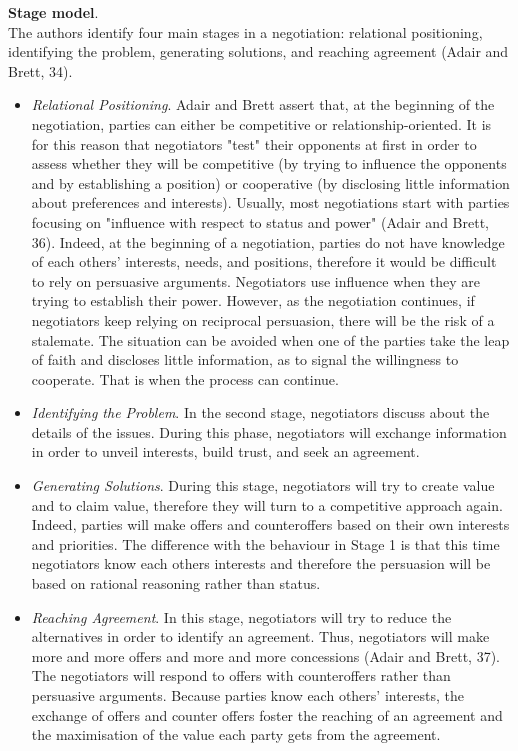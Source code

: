 \documentclass[../main.tex]{subfiles}
\begin{document}
\textbf{Stage model}.\\
The authors identify four main stages in a negotiation: relational positioning, identifying the problem, generating solutions, and reaching agreement (Adair and Brett, 34). 
\begin{itemize}
    \item \textit{Relational Positioning}. Adair and Brett assert that, at the beginning of the negotiation, parties can either be competitive or relationship-oriented. It is for this reason that negotiators "test" their opponents at first in order to assess whether they will be competitive (by trying to influence the opponents and by establishing a position) or cooperative (by disclosing little information about preferences and interests). Usually, most negotiations start with parties focusing on "influence with respect to status and power" (Adair and Brett, 36). Indeed, at the beginning of a negotiation, parties do not have knowledge of each others' interests, needs, and positions, therefore it would be difficult to rely on persuasive arguments. Negotiators use influence when they are trying to establish their power. However, as the negotiation continues, if negotiators keep relying on reciprocal persuasion, there will be the risk of a stalemate. The situation can be avoided when one of the parties take the leap of faith and discloses little information, as to signal the willingness to cooperate. That is when the process can continue.
    \item \textit{Identifying the Problem}. In the second stage, negotiators discuss about the details of the issues. During this phase, negotiators will exchange information in order to unveil interests, build trust, and seek an agreement.
    \item \textit{Generating Solutions}. During this stage, negotiators will try to create value and to claim value, therefore they will turn to a competitive approach again. Indeed, parties will make offers and counteroffers based on their own interests and priorities. The difference with the behaviour in Stage 1 is that this time negotiators know each others interests and therefore the persuasion will be based on rational reasoning rather than status.
    \item \textit{Reaching Agreement}. In this stage, negotiators will try to reduce the alternatives in order to identify an agreement. Thus, negotiators will make more and more offers and more and more concessions (Adair and Brett, 37). The negotiators will respond to offers with counteroffers rather than persuasive arguments. Because parties know each others' interests, the exchange of offers and counter offers foster the reaching of an agreement and the maximisation of the value each party gets from the agreement.
\end{itemize}
\end{document}
